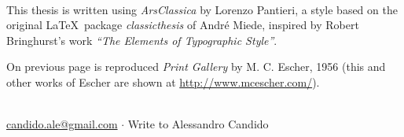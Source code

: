 
\clearpage
{}
\thispagestyle{empty}

\hfill

\vfill


\noindent{}\rmfamily\\
This thesis is written using \textit{ArsClassica} by Lorenzo Pantieri, a style
based on the original \LaTeX~package \textit{classicthesis} of André Miede,
inspired by Robert Bringhurst’s work \textit{“The Elements of Typographic
Style”}.
\newline

\noindent On previous page is reproduced \textit{Print Gallery} by M. C.
Escher, 1956 (this and other works of Escher are shown at
\href{http://www.mcescher.com/}{http://www.mcescher.com/}).
\vspace*{15pt}

\noindent{}\rmfamily\\
\leftpointright	 \href{mailto:candido.ale@gmail.com}{candido.ale@gmail.com}
$\cdot$ Write to Alessandro Candido
